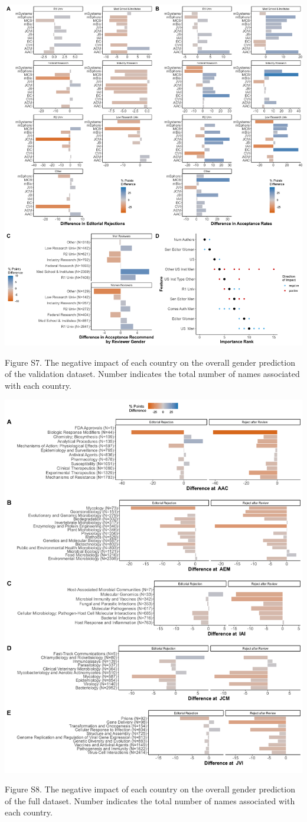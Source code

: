 \documentclass[11pt,]{article}
\begin{document}
\includegraphics{Figure_S7.png}

Figure S7. The negative impact of each country on the overall gender
prediction of the validation dataset. Number indicates the total number
of names associated with each country.

\newpage

\includegraphics{Figure_S8.png}

Figure S8. The negative impact of each country on the overall gender
prediction of the full dataset. Number indicates the total number of
names associated with each country.
\end{document}
